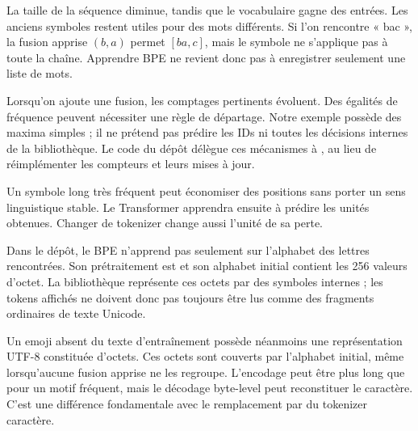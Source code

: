La taille de la séquence diminue, tandis que le vocabulaire gagne des entrées.
Les anciens symboles restent utiles pour des mots différents. Si l'on
rencontre « bac », la fusion apprise \((b,a)\) permet \([ba,c]\),
mais le symbole  ne s'applique pas à toute la chaîne.
Apprendre BPE ne revient donc pas à enregistrer seulement une liste de mots.

Lorsqu'on ajoute une fusion, les comptages pertinents évoluent.
Des égalités de fréquence peuvent nécessiter une règle de départage.
Notre exemple possède des maxima simples ; il ne prétend pas prédire
les IDs ni toutes les décisions internes de la bibliothèque.
Le code du dépôt délègue ces mécanismes à , au lieu
de réimplémenter les compteurs et leurs mises à jour.

Un symbole long très fréquent peut économiser des positions sans porter
un sens linguistique stable. Le Transformer apprendra ensuite à prédire
les unités obtenues. Changer de tokenizer change aussi l'unité de sa perte.


Dans le dépôt, le BPE n'apprend pas seulement sur l'alphabet des lettres
rencontrées. Son prétraitement est 
et son alphabet initial contient les 256 valeurs d'octet.
La bibliothèque représente ces octets par des symboles internes ;
les tokens affichés ne doivent donc pas toujours être lus comme des fragments
ordinaires de texte Unicode.

Un emoji absent du texte d'entraînement possède néanmoins une représentation
UTF-8 constituée d'octets. Ces octets sont couverts par l'alphabet initial,
même lorsqu'aucune fusion apprise ne les regroupe. L'encodage peut être plus
long que pour un motif fréquent, mais le décodage byte-level peut reconstituer
le caractère. C'est une différence fondamentale avec le remplacement par
 du tokenizer caractère.

